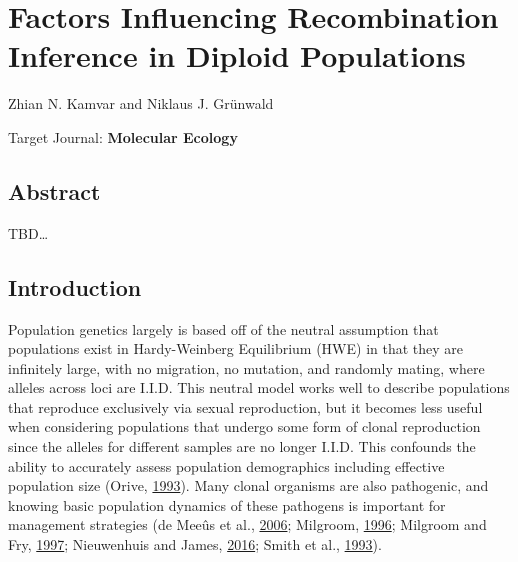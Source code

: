 \documentclass[double,12pt]{beavtex}
\begin{document}
  \chapter{Factors Influencing Recombination Inference in Diploid
  Populations}\label{factors-influencing-recombination-inference-in-diploid-populations}
  
  \singlespacing
  
  \begin{center}
  
  
  Zhian N. Kamvar and Niklaus J. Grünwald
  
  
  
  \end{center}\vspace*{\fill}
  
  Target Journal: \textbf{Molecular Ecology}
  
  \doublespacing
  \newpage
  
  \section{Abstract}\label{abstract-3}
  
  TBD\ldots{}
  
  \section{Introduction}\label{introduction-4}
  
  Population genetics largely is based off of the neutral assumption that
  populations exist in Hardy-Weinberg Equilibrium (HWE) in that they are
  infinitely large, with no migration, no mutation, and randomly mating,
  where alleles across loci are I.I.D. This neutral model works well to
  describe populations that reproduce exclusively via sexual reproduction,
  but it becomes less useful when considering populations that undergo
  some form of clonal reproduction since the alleles for different samples
  are no longer I.I.D. This confounds the ability to accurately assess
  population demographics including effective population size (Orive,
  \protect\hyperlink{ref-orive1993effective}{1993}). Many clonal organisms
  are also pathogenic, and knowing basic population dynamics of these
  pathogens is important for management strategies (de Meeûs et al.,
  \protect\hyperlink{ref-de2006molecular}{2006}; Milgroom,
  \protect\hyperlink{ref-milgroom1996recombination}{1996}; Milgroom and
  Fry, \protect\hyperlink{ref-milgroom1997contributions}{1997};
  Nieuwenhuis and James,
  \protect\hyperlink{ref-nieuwenhuis2016frequency}{2016}; Smith et al.,
  \protect\hyperlink{ref-smith1993how}{1993}).
  
\end{document}

